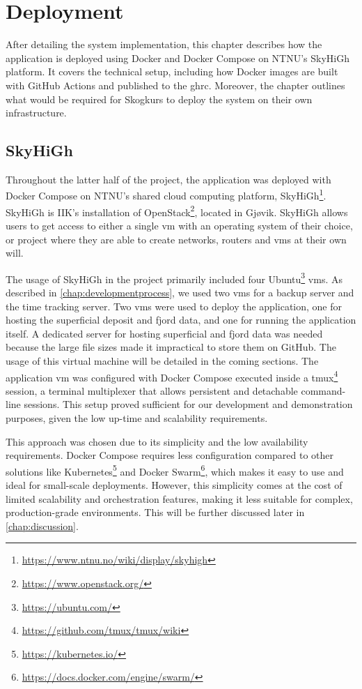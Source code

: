   \chapter{Deployment}\label{chap:deployment}

After detailing the system implementation, this chapter describes how the application is deployed using Docker and Docker Compose on NTNU's SkyHiGh platform. It covers the technical setup, including how Docker images are built with GitHub Actions and published to the \acrlong{ghrc}. Moreover, the chapter outlines what would be required for Skogkurs to deploy the system on their own infrastructure.

\section{SkyHiGh}

Throughout the latter half of the project, the application was deployed with Docker Compose on NTNU's shared cloud computing platform, SkyHiGh\footnote{\url{https://www.ntnu.no/wiki/display/skyhigh}}. SkyHiGh is IIK's installation of OpenStack\footnote{\url{https://www.openstack.org/}}, located in Gjøvik. SkyHiGh allows users to get access to either a single \acrfull{vm} with an operating system of their choice, or project where they are able to create networks, routers and \acrshort{vm}s at their own will.

The usage of SkyHiGh in the project primarily included four Ubuntu\footnote{\url{https://ubuntu.com/}} \acrshort{vm}s. As described in \autoref{chap:developmentprocess}, we used two \acrshort{vm}s for a backup server and the time tracking server. Two \acrshort{vm}s were used to deploy the application, one for hosting the superficial deposit and fjord data, and one for running the application itself. A dedicated server for hosting superficial and fjord data was needed because the large file sizes made it impractical to store them on GitHub. The usage of this virtual machine will be detailed in the coming sections. The application \acrshort{vm} was configured with Docker Compose executed inside a tmux\footnote{\url{https://github.com/tmux/tmux/wiki}} session, a terminal multiplexer that allows persistent and detachable command-line sessions. This setup proved sufficient for our development and demonstration purposes, given the low up-time and scalability requirements.

This approach was chosen due to its simplicity and the low availability requirements. Docker Compose requires less configuration compared to other solutions like Kubernetes\footnote{\url{https://kubernetes.io/}} and Docker Swarm\footnote{\url{https://docs.docker.com/engine/swarm/}}, which makes it easy to use and ideal for small-scale deployments. However, this simplicity comes at the cost of limited scalability and orchestration features, making it less suitable for complex, production-grade environments. This will be further discussed later in \autoref{chap:discussion}.

